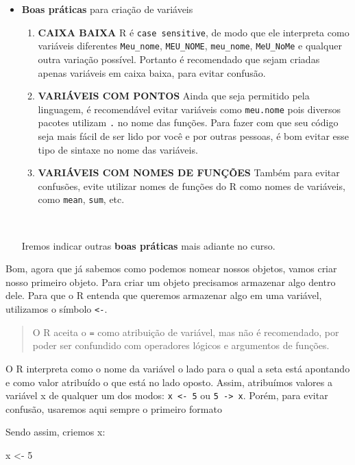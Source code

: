 \documentclass[]{book}
\newenvironment{Shaded}{\begin{snugshade}}{\end{snugshade}}
\newcommand{\DecValTok}[1]{\textcolor[rgb]{0.00,0.00,0.81}{#1}}
\newcommand{\NormalTok}[1]{#1}
\newcommand{\StringTok}[1]{\textcolor[rgb]{0.31,0.60,0.02}{#1}}
\providecommand{\tightlist}{%
  \setlength{\itemsep}{0pt}\setlength{\parskip}{0pt}}
\theoremstyle{definition}
\theoremstyle{definition}
\theoremstyle{definition}
\theoremstyle{remark}
\begin{document}
\begin{itemize}
  ~
\item
  \textbf{Boas práticas} para criação de variáveis

  \begin{enumerate}
  \def\labelenumi{\arabic{enumi}.}
  \tightlist
  \item
    \textbf{CAIXA BAIXA}
    R é \texttt{case\ sensitive}, de modo que ele interpreta como variáveis diferentes \texttt{Meu\_nome}, \texttt{MEU\_NOME}, \texttt{meu\_nome}, \texttt{MeU\_NoMe} e qualquer outra variação possível. Portanto é recomendado que sejam criadas apenas variáveis em caixa baixa, para evitar confusão.
  \item
    \textbf{VARIÁVEIS COM PONTOS}
    Ainda que seja permitido pela linguagem, é recomendável evitar variáveis como \texttt{meu.nome} pois diversos pacotes utilizam \texttt{.} no nome das funções. Para fazer com que seu código seja mais fácil de ser lido por você e por outras pessoas, é bom evitar esse tipo de sintaxe no nome das variáveis.
  \item
    \textbf{VARIÁVEIS COM NOMES DE FUNÇÕES}
    Também para evitar confusões, evite utilizar nomes de funções do R como nomes de variáveis, como \texttt{mean}, \texttt{sum}, etc.
  \end{enumerate}

  ~

  Iremos indicar outras \textbf{boas práticas} mais adiante no curso.
\end{itemize}

Bom, agora que já sabemos como podemos nomear nossos objetos, vamos criar nosso primeiro objeto. Para criar um objeto precisamos armazenar algo dentro dele. Para que o R entenda que queremos armazenar algo em uma variável, utilizamos o símbolo \texttt{\textless{}-}.

\begin{quote}
O R aceita o \texttt{=} como atribuição de variável, mas não é recomendado, por poder ser confundido com operadores lógicos e argumentos de funções.
\end{quote}

O R interpreta como o nome da variável o lado para o qual a seta está apontando e como valor atribuído o que está no lado oposto. Assim, atribuímos valores a variável x de qualquer um dos modos: \texttt{x\ \textless{}-\ 5} ou \texttt{5\ -\textgreater{}\ x}. Porém, para evitar confusão, usaremos aqui sempre o primeiro formato

Sendo assim, criemos x:

\begin{Shaded}
\begin{Highlighting}[]
\NormalTok{x <-}\StringTok{ }\DecValTok{5}
\end{Highlighting}
\end{Shaded}
\end{document}
